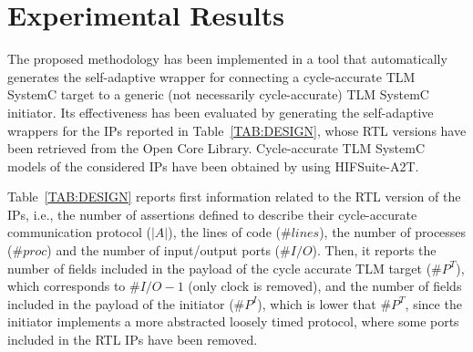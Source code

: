 
\chapter{Experimental Results}\label{chap8:results}
The proposed methodology has been implemented in a tool that automatically generates the self-adaptive wrapper for connecting a cycle-accurate TLM SystemC target to a generic (not necessarily cycle-accurate) TLM SystemC initiator.
Its effectiveness has been evaluated by generating the self-adaptive wrappers for the IPs reported in Table~\ref{TAB:DESIGN}, whose RTL versions have been retrieved from the Open Core Library. Cycle-accurate TLM SystemC models of the considered IPs have been obtained by using HIFSuite-A2T. 

Table~\ref{TAB:DESIGN} reports first information related to the RTL version of the IPs, i.e., the number of assertions defined to describe their cycle-accurate communication protocol ($|A|$), the lines of code ($\#lines$), the number of processes ($\#proc$) and the number of input/output ports ($\#I/O$). Then, it reports the number of fields included in the payload of the cycle accurate TLM target ($\#P^T$), which corresponds to $\#I/O-1$ (only clock is removed), and the number of fields included in the payload of the initiator ($\#P^I$), which is lower that $\#P^T$, since the initiator implements a more abstracted loosely timed protocol, where some ports included in the RTL IPs have been removed.


